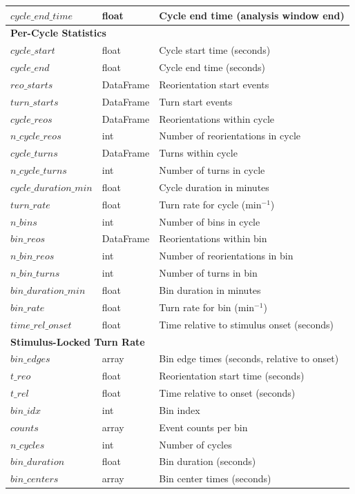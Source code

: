 \documentclass[
  11pt,
]{article}
\begin{document}
\begin{table}[H]
\begin{tabular}{p{3cm}p{2cm}p{9cm}}
$cycle\_end\_time$ & float & Cycle end time (analysis window end) \\
\hline
\multicolumn{3}{l}{\textbf{Per-Cycle Statistics}} \\
\hline
$cycle\_start$ & float & Cycle start time (seconds) \\
$cycle\_end$ & float & Cycle end time (seconds) \\
$reo\_starts$ & DataFrame & Reorientation start events \\
$turn\_starts$ & DataFrame & Turn start events \\
$cycle\_reos$ & DataFrame & Reorientations within cycle \\
$n\_cycle\_reos$ & int & Number of reorientations in cycle \\
$cycle\_turns$ & DataFrame & Turns within cycle \\
$n\_cycle\_turns$ & int & Number of turns in cycle \\
$cycle\_duration\_min$ & float & Cycle duration in minutes \\
$turn\_rate$ & float & Turn rate for cycle (min$^{-1}$) \\
$n\_bins$ & int & Number of bins in cycle \\
$bin\_reos$ & DataFrame & Reorientations within bin \\
$n\_bin\_reos$ & int & Number of reorientations in bin \\
$n\_bin\_turns$ & int & Number of turns in bin \\
$bin\_duration\_min$ & float & Bin duration in minutes \\
$bin\_rate$ & float & Turn rate for bin (min$^{-1}$) \\
$time\_rel\_onset$ & float & Time relative to stimulus onset (seconds) \\
\hline
\multicolumn{3}{l}{\textbf{Stimulus-Locked Turn Rate}} \\
\hline
$bin\_edges$ & array & Bin edge times (seconds, relative to onset) \\
$t\_reo$ & float & Reorientation start time (seconds) \\
$t\_rel$ & float & Time relative to onset (seconds) \\
$bin\_idx$ & int & Bin index \\
$counts$ & array & Event counts per bin \\
$n\_cycles$ & int & Number of cycles \\
$bin\_duration$ & float & Bin duration (seconds) \\
$bin\_centers$ & array & Bin center times (seconds) \\

\end{tabular}
\end{table}
\end{document}
